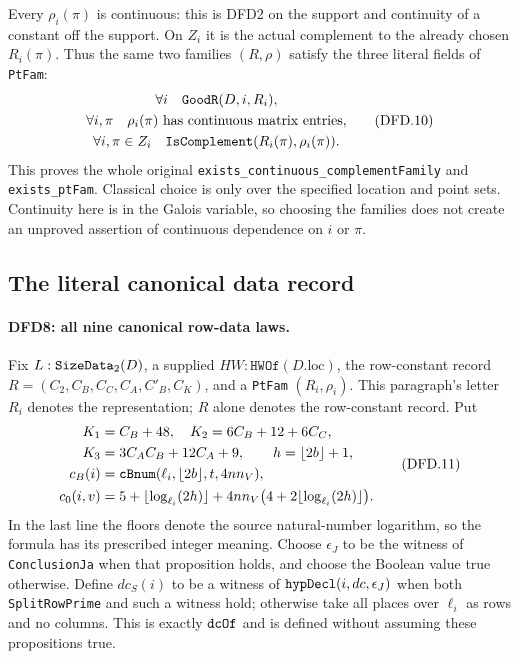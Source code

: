 \documentclass[11pt,a4paper]{article}
\numberwithin{equation}{section}
\theoremstyle{remark}\newtheorem{remark}[theorem]{Remark}
\begin{document}
Every $\rho_i(\pi)$ is continuous: this is DFD2 on the support
and continuity of a constant off the support. On $Z_i$ it is
the actual complement to the already chosen $R_i(\pi)$.
Thus the same two families $(R,\rho)$ satisfy the three
literal fields of \texttt{Pt\allowbreak Fam}:
\[
 \begin{gathered}
   \forall i\quad\texttt{Good\allowbreak R}(D,i,R_i),\\
   \forall i,\pi\quad\rho_i(\pi)\text{ has continuous matrix entries},\\
   \forall i,\pi\in Z_i\quad
       \texttt{Is\allowbreak Complement}(R_i(\pi),\rho_i(\pi)).
 \end{gathered}                                         \tag{DFD.10}
\]
This proves the whole original
\texttt{exists\_\allowbreak continuous\_\allowbreak complement\allowbreak Family} and
\texttt{exists\_\allowbreak pt\allowbreak Fam}. Classical choice is only over the
specified location and point sets. Continuity here is in the
Galois variable, so choosing the families does not create an
unproved assertion of continuous dependence on $i$ or $\pi$.

\subsection{The literal canonical data record}

\paragraph{DFD8: all nine canonical row-data laws.}
\label{claim:DFD8}
Fix $L:\texttt{Size\allowbreak Data}_2(D)$, a supplied
$HW:\texttt{HWOf}(D.\mathrm{loc})$, the row-constant record
$R=(C_2,C_B,C_C,C_A,C'_B,C_K)$, and a \texttt{Pt\allowbreak Fam}
$(R_i,\rho_i)$. This paragraph's letter $R_i$ denotes the
representation; $R$ alone denotes the row-constant record.
Put
\[
 \begin{split}
 K_1&=C_B+48,\quad K_2=6C_B+12+6C_C,\\
 K_3&=3C_AC_B+12C_A+9,\qquad h=\lfloor2b\rfloor+1,\\
 c_B(i)&=\texttt{c\allowbreak Bnum}(\ell_i,\lfloor2b\rfloor,t,4nn_V),\\
 c_0(i,v)&=5+\lfloor\log_{\ell_i}(2h)\rfloor
       +4nn_V\bigl(4+2\lfloor\log_{\ell_i}(2h)\rfloor\bigr).
 \end{split}                                           \tag{DFD.11}
\]
In the last line the floors denote the source natural-number
logarithm, so the formula has its prescribed integer meaning.
Choose $\epsilon_J$ to be the witness of
\texttt{Conclusion\allowbreak Ja} when that proposition holds, and choose
the Boolean value true otherwise. Define $dc_S(i)$ to be a
witness of $\texttt{hyp\allowbreak Decl}(i,dc,\epsilon_J)$ when both
\texttt{Split\allowbreak Row\allowbreak Prime} and such a witness hold; otherwise take
all places over $\ell_i$ as rows and no columns. This is exactly
$\texttt{dc\allowbreak Of}$ and is defined without assuming these
propositions true.
\end{document}
